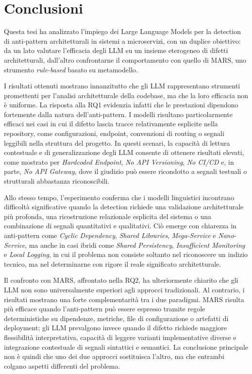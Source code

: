 \chapter{Conclusioni}

Questa tesi ha analizzato l’impiego dei Large Language Models per la detection di anti-pattern architetturali in sistemi a microservizi, con un duplice obiettivo: da un lato valutare l’efficacia degli LLM su un insieme eterogeneo di difetti architetturali, dall’altro confrontarne il comportamento con quello di MARS, uno strumento \textit{rule-based} basato su metamodello.

I risultati ottenuti mostrano innanzitutto che gli LLM rappresentano strumenti promettenti per l’analisi architetturale della codebase, ma che la loro efficacia non è uniforme. La risposta alla RQ1 evidenzia infatti che le prestazioni dipendono fortemente dalla natura dell’anti-pattern. I modelli risultano particolarmente efficaci nei casi in cui il difetto lascia tracce relativamente esplicite nella repository, come configurazioni, endpoint, convenzioni di routing o segnali leggibili nella struttura del progetto. In questi scenari, la capacità di lettura contestuale e di generalizzazione degli LLM consente di ottenere risultati elevati, come mostrato per \textit{Hardcoded Endpoint}, \textit{No API Versioning}, \textit{No CI/CD} e, in parte, \textit{No API Gateway}, dove il giudizio può essere ricondotto a segnali testuali o strutturali abbastanza riconoscibili.

Allo stesso tempo, l’esperimento conferma che i modelli linguistici incontrano difficoltà significative quando la detection richiede una validazione architetturale più profonda, una ricostruzione relazionale esplicita del sistema o una combinazione di segnali quantitativi e qualitativi. Ciò emerge con chiarezza in anti-pattern come \textit{Cyclic Dependency}, \textit{Shared Libraries}, \textit{Mega-Service} e \textit{Nano-Service}, ma anche in casi ibridi come \textit{Shared Persistency}, \textit{Insufficient Monitoring} e \textit{Local Logging}, in cui il problema non consiste soltanto nel riconoscere un indizio tecnico, ma nel determinarne con rigore il reale significato architetturale.

Il confronto con MARS, affrontato nella RQ2, ha ulteriormente chiarito che gli LLM non sono universalmente superiori agli approcci tradizionali. Al contrario, i risultati mostrano una forte complementarità tra i due paradigmi. MARS risulta più efficace quando l’anti-pattern può essere espresso tramite regole deterministiche su dipendenze, metriche, file di configurazione o artefatti di deployment; gli LLM prevalgono invece quando il difetto richiede maggiore flessibilità interpretativa, capacità di leggere varianti implementative diverse e integrazione contestuale di segnali sintattici e semantici. La conclusione principale non è quindi che uno dei due approcci sostituisca l’altro, ma che entrambi colgano aspetti differenti del problema.


